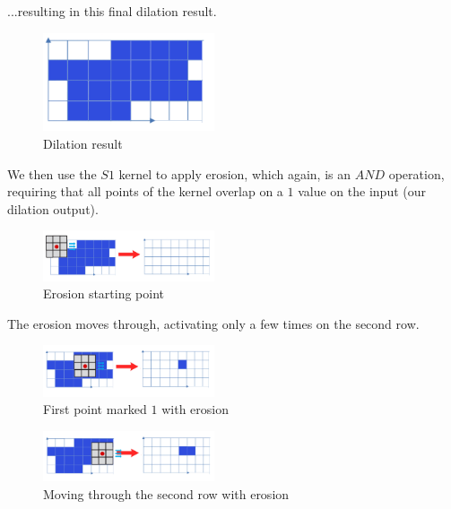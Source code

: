 \documentclass{article}
\begin{document}
...resulting in this final dilation result.

\begin{figure}[H]
    \centering
    \includegraphics[width = 0.45\textwidth]{imgs/5/b8.png}
    \caption{Dilation result}
    \label{fig:b8}
\end{figure}

We then use the $S1$ kernel to apply erosion, which again, is an $AND$ operation, requiring that all points of the kernel overlap on a $1$ value on the input (our dilation output).

\begin{figure}[H]
    \centering
    \includegraphics[width = 0.45\textwidth]{imgs/5/b9.png}
    \caption{Erosion starting point}
    \label{fig:b9}
\end{figure}

The erosion moves through, activating only a few times on the second row.

\begin{figure}[H]
    \centering
    \includegraphics[width = 0.45\textwidth]{imgs/5/b10.png}
    \caption{First point marked $1$ with erosion}
    \label{fig:b10}
\end{figure}

\begin{figure}[H]
    \centering
    \includegraphics[width = 0.45\textwidth]{imgs/5/b11.png}
    \caption{Moving through the second row with erosion}
    \label{fig:b11}
\end{figure}
\end{document}

